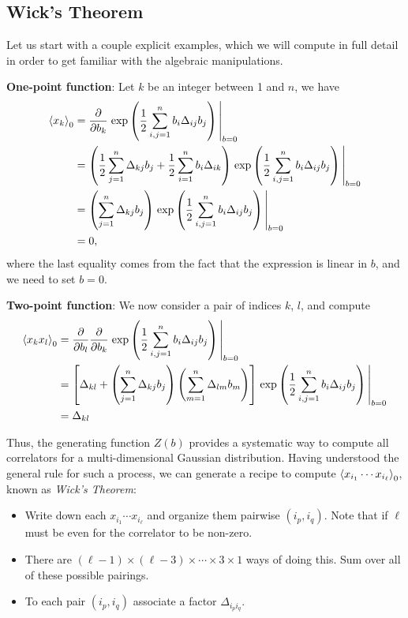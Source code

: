 \documentclass{article}
\numberwithin{equation}{section}
\begin{document}
\subsection{Wick's Theorem}

Let us start with a couple explicit examples, which we will compute in full detail in order to get familiar with the algebraic manipulations.

\textbf{One-point function}: Let $k$ be an integer between 1 and $n$, we have 
\begin{equation}
\begin{aligned}
    \ev{x_k}_0 &= \pdv{b_k} \eval{\exp\left(\frac{1}{2}\sum_{i,j = 1}^n b_i \Delta_{ij} b_j \right)}_{b=0} \\
    &= \left(\frac{1}{2}\sum_{j=1}^n \Delta_{kj}b_j + \frac{1}{2}\sum_{i=1}^n b_i \Delta_{ik} \right)\eval{\exp\left(\frac{1}{2}\sum_{i,j = 1}^n b_i \Delta_{ij} b_j \right)}_{b=0} \\
    &= \left(\sum_{j=1}^n \Delta_{kj}b_j\right)\eval{\exp\left(\frac{1}{2}\sum_{i,j = 1}^n b_i \Delta_{ij} b_j \right)}_{b=0} \\
    &= 0,
\end{aligned}
\end{equation}
where the last equality comes from the fact that the expression is linear in $b$, and we need to set $b=0$.

\textbf{Two-point function}: We now consider a pair of indices $k$, $l$, and compute
\begin{equation}
\begin{aligned}
    \ev{x_k x_l}_0 &= \pdv{b_l} \pdv{b_k} \eval{\exp\left(\frac{1}{2}\sum_{i,j = 1}^n b_i \Delta_{ij} b_j \right)}_{b=0} \\
    &= \left[\Delta_{kl} + \left(\sum_{j=1}^n \Delta_{kj} b_j \right) \left(\sum_{m=1}^n \Delta_{lm} b_m \right)\right] \eval{\exp\left(\frac{1}{2}\sum_{i,j = 1}^n b_i \Delta_{ij} b_j \right)}_{b=0} \\
    &= \Delta_{kl}
\end{aligned}
\end{equation}

Thus, the generating function $Z(b)$ provides a systematic way to compute all correlators for a multi-dimensional Gaussian distribution. Having understood the general rule for such a process, we can generate a recipe to compute $\ev{x_{i_1} \cdots x_{i_\ell}}_0$, known as \textit{Wick's Theorem}:
\begin{itemize}
    \item Write down each $x_{i_1} \cdots x_{i_\ell}$ and organize them pairwise $(i_p, i_q)$. Note that if $\ell$ must be even for the correlator to be non-zero.
    \item There are $(\ell - 1)\times(\ell-3) \times \cdots \times 3 \times 1$ ways of doing this. Sum over all of these possible pairings.
    \item To each pair $(i_p, i_q)$ associate a factor $\Delta_{i_p i_q}$.
\end{itemize}
\end{document}
